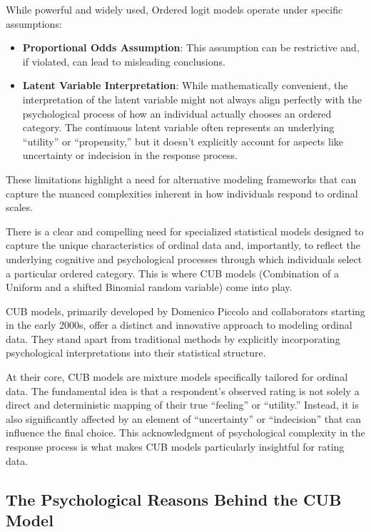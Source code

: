 \documentclass[
  letterpaper,
  DIV=11,
  numbers=noendperiod]{scrartcl}
\begin{document}
While powerful and widely used, Ordered logit models operate under
specific assumptions:

\begin{itemize}
\item
  \textbf{Proportional Odds Assumption}: This assumption can be
  restrictive and, if violated, can lead to misleading conclusions.
\item
  \textbf{Latent Variable Interpretation}: While mathematically
  convenient, the interpretation of the latent variable might not always
  align perfectly with the psychological process of how an individual
  actually chooses an ordered category. The continuous latent variable
  often represents an underlying ``utility'' or ``propensity,'' but it
  doesn't explicitly account for aspects like uncertainty or indecision
  in the response process.
\end{itemize}

These limitations highlight a need for alternative modeling frameworks
that can capture the nuanced complexities inherent in how individuals
respond to ordinal scales.

There is a clear and compelling need for specialized statistical models
designed to capture the unique characteristics of ordinal data and,
importantly, to reflect the underlying cognitive and psychological
processes through which individuals select a particular ordered
category. This is where CUB models (Combination of a Uniform and a
shifted Binomial random variable) come into play.

CUB models, primarily developed by Domenico Piccolo and collaborators
starting in the early 2000s, offer a distinct and innovative approach to
modeling ordinal data. They stand apart from traditional methods by
explicitly incorporating psychological interpretations into their
statistical structure.

At their core, CUB models are mixture models specifically tailored for
ordinal data. The fundamental idea is that a respondent's observed
rating is not solely a direct and deterministic mapping of their true
``feeling'' or ``utility.'' Instead, it is also significantly affected
by an element of ``uncertainty'' or ``indecision'' that can influence
the final choice. This acknowledgment of psychological complexity in the
response process is what makes CUB models particularly insightful for
rating data.

\hypertarget{the-psychological-reasons-behind-the-cub-model}{%
\subsection{The Psychological Reasons Behind the CUB
Model}\label{the-psychological-reasons-behind-the-cub-model}}
\end{document}
